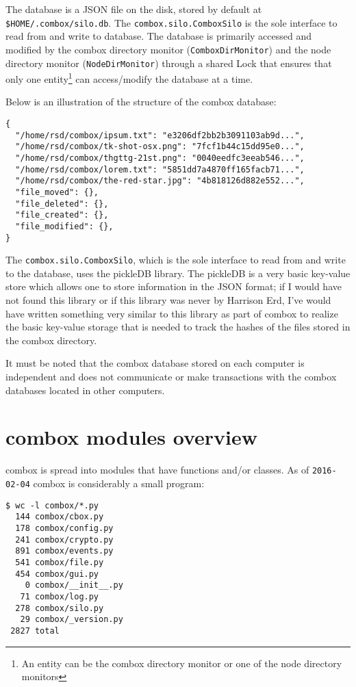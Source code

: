 The database is a JSON file on the disk, stored by default at
\verb+$HOME/.combox/silo.db+. The
\verb+combox.silo.ComboxSilo+\cite{combox-src:silo.ComboxSilo} is the
sole interface to read from and write to database. The database is
primarily accessed and modified by the combox directory monitor
(\verb+ComboxDirMonitor+) and the node directory monitor
(\verb+NodeDirMonitor+) through a shared Lock\cite{py:threading.Lock}
that ensures that only one entity\footnote{An entity can be the combox
  directory monitor or one of the node directory monitors} can
access/modify the database at a time.

Below is an illustration of the structure of the combox database:

\begin{verbatim}
{
  "/home/rsd/combox/ipsum.txt": "e3206df2bb2b3091103ab9d...",
  "/home/rsd/combox/tk-shot-osx.png": "7fcf1b44c15dd95e0...",
  "/home/rsd/combox/thgttg-21st.png": "0040eedfc3eeab546...",
  "/home/rsd/combox/lorem.txt": "5851dd7a4870ff165facb71...",
  "/home/rsd/combox/the-red-star.jpg": "4b818126d882e552...",
  "file_moved": {},
  "file_deleted": {},
  "file_created": {},
  "file_modified": {},
}
\end{verbatim}

The \verb+combox.silo.ComboxSilo+, which is the sole interface to read
from and write to the database, uses the pickleDB
library\cite{pylib:pickledb}. The pickleDB is a very basic key-value
store which allows one to store information in the JSON format; if I
would have not found this library or if this library was never by
Harrison Erd, I've would have written something very similar to this
library as part of combox to realize the basic key-value storage that
is needed to track the hashes of the files stored in the combox
directory.

It must be noted that the combox database stored on each computer is
independent and does not communicate or make transactions with the
combox databases located in other computers.

\section{combox modules overview}

combox is spread into modules that have functions and/or classes. As
of \verb+2016-02-04+ combox is considerably a small program:

\begin{verbatim}
$ wc -l combox/*.py
  144 combox/cbox.py
  178 combox/config.py
  241 combox/crypto.py
  891 combox/events.py
  541 combox/file.py
  454 combox/gui.py
    0 combox/__init__.py
   71 combox/log.py
  278 combox/silo.py
   29 combox/_version.py
 2827 total
\end{verbatim}

